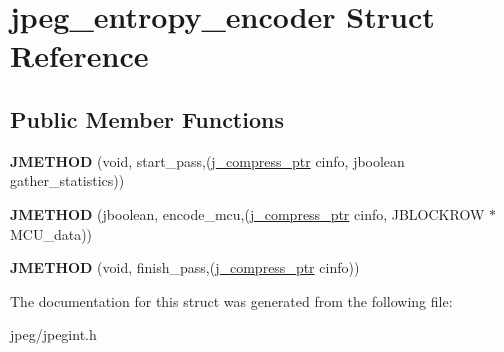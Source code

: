 \hypertarget{structjpeg__entropy__encoder}{}\section{jpeg\+\_\+entropy\+\_\+encoder Struct Reference}
\label{structjpeg__entropy__encoder}
\subsection*{Public Member Functions}
\begin{DoxyCompactItemize}
\item 
{\bfseries J\+M\+E\+T\+H\+OD} (void, start\+\_\+pass,(\hyperlink{structjpeg__compress__struct}{j\+\_\+compress\+\_\+ptr} cinfo, jboolean gather\+\_\+statistics))\hypertarget{structjpeg__entropy__encoder_a9ced1876c5a9654695e215268448bc42}{}\label{structjpeg__entropy__encoder_a9ced1876c5a9654695e215268448bc42}

\item 
{\bfseries J\+M\+E\+T\+H\+OD} (jboolean, encode\+\_\+mcu,(\hyperlink{structjpeg__compress__struct}{j\+\_\+compress\+\_\+ptr} cinfo, J\+B\+L\+O\+C\+K\+R\+OW $\ast$M\+C\+U\+\_\+data))\hypertarget{structjpeg__entropy__encoder_aa338e06dbf481730f956b77e61caa8a0}{}\label{structjpeg__entropy__encoder_aa338e06dbf481730f956b77e61caa8a0}

\item 
{\bfseries J\+M\+E\+T\+H\+OD} (void, finish\+\_\+pass,(\hyperlink{structjpeg__compress__struct}{j\+\_\+compress\+\_\+ptr} cinfo))\hypertarget{structjpeg__entropy__encoder_a349e641fd2289448e8169b8aa8edefa5}{}\label{structjpeg__entropy__encoder_a349e641fd2289448e8169b8aa8edefa5}

\end{DoxyCompactItemize}


The documentation for this struct was generated from the following file\+:\begin{DoxyCompactItemize}
\item 
jpeg/jpegint.\+h\end{DoxyCompactItemize}
